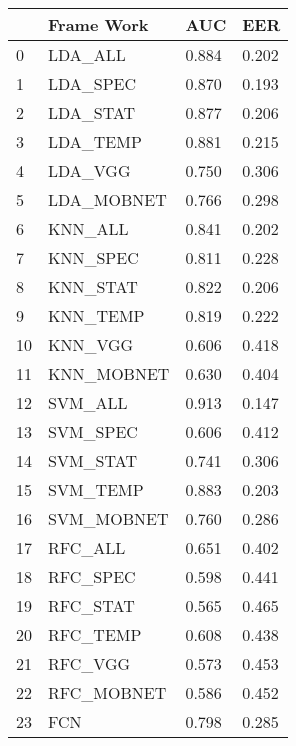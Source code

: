 \begin{tabular}{llll}
\toprule
{} &  Frame Work &    AUC &    EER \\
\midrule
0  &     LDA\_ALL &  0.884 &  0.202 \\
1  &    LDA\_SPEC &   0.870 &  0.193 \\
2  &    LDA\_STAT &  0.877 &  0.206 \\
3  &    LDA\_TEMP &  0.881 &  0.215 \\
4  &     LDA\_VGG &   0.750 &  0.306 \\
5  &  LDA\_MOBNET &  0.766 &  0.298 \\\bottomrule
6  &     KNN\_ALL &  0.841 &  0.202 \\
7  &    KNN\_SPEC &  0.811 &  0.228 \\
8  &    KNN\_STAT &  0.822 &  0.206 \\
9  &    KNN\_TEMP &  0.819 &  0.222 \\
10 &     KNN\_VGG &  0.606 &  0.418 \\
11 &  KNN\_MOBNET &   0.630 &  0.404 \\\bottomrule
12 &     SVM\_ALL &  0.913 &  0.147 \\
13 &    SVM\_SPEC &  0.606 &  0.412 \\
14 &    SVM\_STAT &  0.741 &  0.306 \\
15 &    SVM\_TEMP &  0.883 &  0.203 \\
16 &  SVM\_MOBNET &   0.760 &  0.286 \\\bottomrule
17 &     RFC\_ALL &  0.651 &  0.402 \\
18 &    RFC\_SPEC &  0.598 &  0.441 \\
19 &    RFC\_STAT &  0.565 &  0.465 \\
20 &    RFC\_TEMP &  0.608 &  0.438 \\
21 &     RFC\_VGG &  0.573 &  0.453 \\
22 &  RFC\_MOBNET &  0.586 &  0.452 \\\bottomrule
23 &         FCN &  0.798 &  0.285 \\
\bottomrule
\end{tabular}
